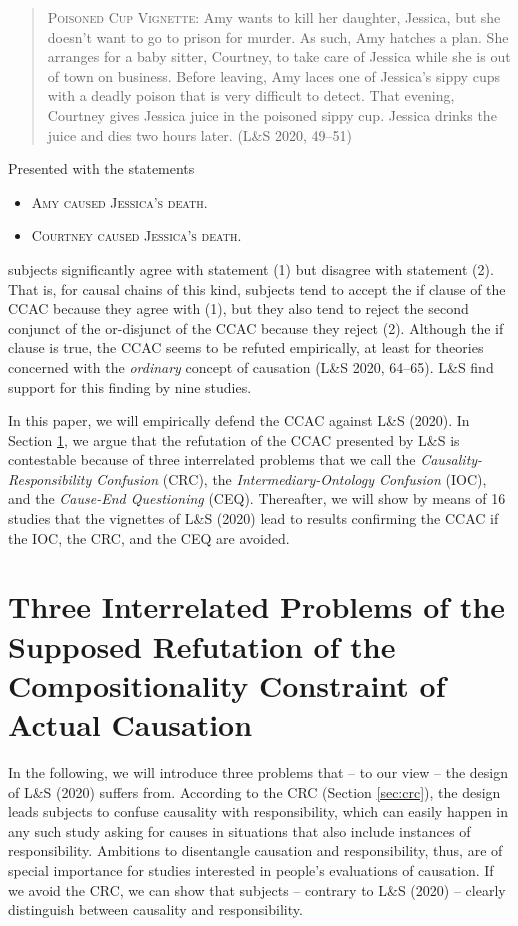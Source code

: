 \documentclass[egregdoesnotlikesansseriftitles,12pt]{scrartcl}
\begin{document}
\begin{quote}
   \textsc{Poisoned Cup Vignette:} Amy wants to kill her daughter, Jessica, but she doesn't want to go to prison for murder. As such, Amy hatches a plan. She arranges for a baby sitter, Courtney, to take care of Jessica while she is out of town on business. Before leaving, Amy laces one of Jessica's sippy cups with a deadly poison that is very difficult to detect. That evening, Courtney gives Jessica juice in the poisoned sippy cup. Jessica drinks the juice and dies two hours later. (L\&S 2020, 49--51)
\end{quote}

\noindent Presented with the statements

\begin{itemize}
   \item[(1)]\textsc{Amy caused Jessica's death.}
   \item[(2)]\textsc{Courtney caused Jessica's death.}
\end{itemize}

\noindent subjects significantly agree with statement (1) but disagree with statement (2). That is, for causal chains of this kind, subjects tend to accept the if clause of the CCAC because they agree with (1), but they also tend to reject the second conjunct of the or-disjunct of the CCAC because they reject (2). Although the if clause is true, the CCAC seems to be refuted empirically, at least for theories concerned with the \textit{ordinary} concept of causation (L\&S 2020, 64--65). L\&S find support for this finding by nine studies.

In this paper, we will empirically defend the CCAC against L\&S (2020). In Section \ref{sec:theory}, we argue that the refutation of the CCAC presented by L\&S is contestable because of three interrelated problems that we call the \textit{Causality-Responsibility Confusion} (CRC), the \textit{Intermediary-Ontology Confusion} (IOC), and the \textit{Cause-End Questioning} (CEQ). Thereafter, we will show by means of 16 studies that the vignettes of L\&S (2020) lead to results confirming the CCAC if the IOC, the CRC, and the CEQ are avoided.

\section{Three Interrelated Problems of the Supposed Refutation of the Compositionality Constraint of Actual Causation}\label{sec:theory}
In the following, we will introduce three problems that -- to our view -- the design of L\&S (2020) suffers from. According to the CRC (Section \ref{sec:crc}), the design leads subjects to confuse causality with responsibility, which can easily happen in any such study asking for causes in situations that also include instances of responsibility. Ambitions to disentangle causation and responsibility, thus, are of special importance for studies interested in people's evaluations of causation. If we avoid the CRC, we can show that subjects -- contrary to L\&S (2020) -- clearly distinguish between causality and responsibility.
\end{document}
